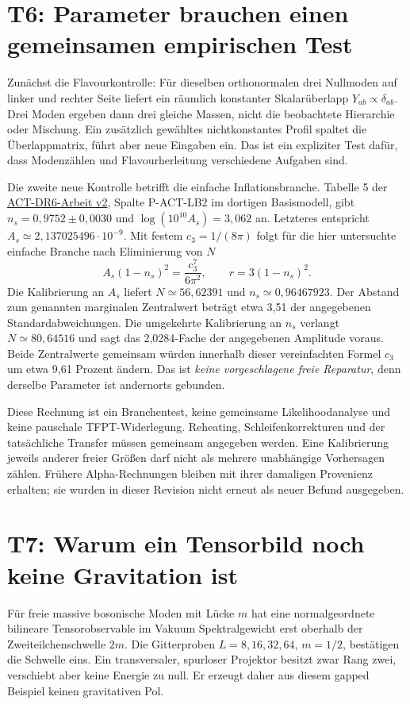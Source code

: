 \section{T6: Parameter brauchen einen gemeinsamen empirischen Test}
Zunächst die Flavourkontrolle: Für dieselben orthonormalen drei Nullmoden auf linker und rechter Seite liefert ein räumlich konstanter Skalarüberlapp $Y_{ab}\propto\delta_{ab}$. Drei Moden ergeben dann drei gleiche Massen, nicht die beobachtete Hierarchie oder Mischung. Ein zusätzlich gewähltes nichtkonstantes Profil spaltet die Überlappmatrix, führt aber neue Eingaben ein. Das ist ein expliziter Test dafür, dass Modenzählen und Flavourherleitung verschiedene Aufgaben sind.

Die zweite neue Kontrolle betrifft die einfache Inflationsbranche. Tabelle 5 der \href{https://arxiv.org/abs/2503.14452v2}{ACT-DR6-Arbeit v2}, Spalte P-ACT-LB2 im dortigen Basismodell, gibt $n_s=0{,}9752\pm0{,}0030$ und $\log(10^{10}A_s)=3{,}062$ an. Letzteres entspricht $A_s\simeq2{,}137025496\cdot10^{-9}$. Mit festem $c_3=1/(8\pi)$ folgt für die hier untersuchte einfache Branche nach Eliminierung von $N$
\begin{equation}
A_s(1-n_s)^2=\frac{c_3^7}{6\pi^2},\qquad r=3(1-n_s)^2.
\end{equation}
Die Kalibrierung an $A_s$ liefert $N\simeq56{,}62391$ und $n_s\simeq0{,}96467923$. Der Abstand zum genannten marginalen Zentralwert beträgt etwa 3,51 der angegebenen Standardabweichungen. Die umgekehrte Kalibrierung an $n_s$ verlangt $N\simeq80{,}64516$ und sagt das 2,0284-Fache der angegebenen Amplitude voraus. Beide Zentralwerte gemeinsam würden innerhalb dieser vereinfachten Formel $c_3$ um etwa 9,61 Prozent ändern. Das ist \emph{keine vorgeschlagene freie Reparatur}, denn derselbe Parameter ist andernorts gebunden.

Diese Rechnung ist ein Branchentest, keine gemeinsame Likelihoodanalyse und keine pauschale TFPT-Widerlegung. Reheating, Schleifenkorrekturen und der tatsächliche Transfer müssen gemeinsam angegeben werden. Eine Kalibrierung jeweils anderer freier Größen darf nicht als mehrere unabhängige Vorhersagen zählen. Frühere Alpha-Rechnungen bleiben mit ihrer damaligen Provenienz erhalten; sie wurden in dieser Revision nicht erneut als neuer Befund ausgegeben.

\section{T7: Warum ein Tensorbild noch keine Gravitation ist}
Für freie massive bosonische Moden mit Lücke $m$ hat eine normalgeordnete bilineare Tensorobservable im Vakuum Spektralgewicht erst oberhalb der Zweiteilchenschwelle $2m$. Die Gitterproben $L=8,16,32,64$, $m=1/2$, bestätigen die Schwelle eins. Ein transversaler, spurloser Projektor besitzt zwar Rang zwei, verschiebt aber keine Energie zu null. Er erzeugt daher aus diesem gapped Beispiel keinen gravitativen Pol.

